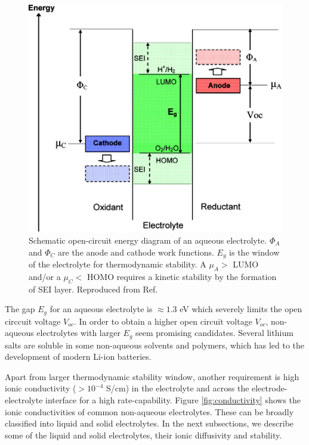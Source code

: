 \documentclass[../main.tex]{subfiles}
\begin{document}
\begin{figure}
    \centering
    \includegraphics{figures/electrolyte.jpeg}
    \caption{Schematic open-circuit energy diagram of an aqueous electrolyte. $\Phi_{A}$ and $\Phi_{C}$ are the anode and cathode work functions. $E_{g}$ is the window of the electrolyte for thermodynamic stability. A $\mu_{A}>$ LUMO and/or a $\mu_{C}<$ HOMO requires a kinetic stability by the formation of SEI layer. Reproduced from Ref.  }
    \label{fig:electrolyte}
\end{figure}

The gap $E_g$ for an aqueous electrolyte is $ \approx 1.3 $  eV which severely limits the open circcuit voltage $V_{oc}$. In order to obtain a higher open circuit voltage $V_{oc}$, non-aqueous electrolytes with larger $E_g$ seem promising candidates. Several lithium salts are soluble in some non-aqueous solvents and polymers, which has led to the development of modern Li-ion batteries.

Apart from larger thermodynamic stability window, another requirement is high ionic conductivity ($>10^{-4}$ S/cm) in the electrolyte and across the electrode-electrolyte interface for a high rate-capability. Figure \ref{fig:conductivity} shows the ionic conductivities of common non-aqueous  electrolytes.\cite{Kamaya2011} These can be broadly classified into liquid and solid electrolytes. In the next subsections, we describe some of the liquid and solid electrolytes, their ionic diffusivity and stability. 
\end{document}
